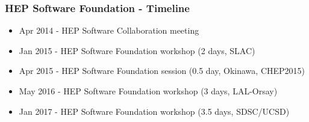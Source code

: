 \begin{frame}
\frametitle{HEP Software Foundation - Timeline}

\begin{itemize}
\item Apr 2014 - HEP Software Collaboration meeting
\item Jan 2015 - HEP Software Foundation workshop (2 days, SLAC)
\item Apr 2015 - HEP Software Foundation session (0.5 day, Okinawa, CHEP2015)
\item May 2016 - HEP Software Foundation workshop (3 days, LAL-Orsay)
\item Jan 2017 - HEP Software Foundation workshop (3.5 days, SDSC/UCSD)
\end{itemize}

\end{frame}


